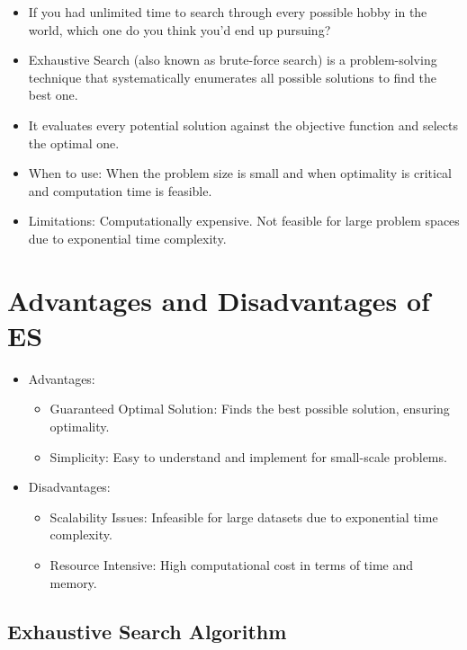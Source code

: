 \documentclass[
  letterpaper,
  DIV=11,
  numbers=noendperiod]{scrreprt}
\providecommand{\tightlist}{%
  \setlength{\itemsep}{0pt}\setlength{\parskip}{0pt}}\usepackage{longtable,booktabs,array}
\begin{document}
\begin{itemize}
\item
  If you had unlimited time to search through every possible hobby in
  the world, which one do you think you'd end up pursuing?
\item
  Exhaustive Search (also known as brute-force search) is a
  problem-solving technique that systematically enumerates all possible
  solutions to find the best one.
\item
  It evaluates every potential solution against the objective function
  and selects the optimal one.
\item
  When to use: When the problem size is small and when optimality is
  critical and computation time is feasible.
\item
  Limitations: Computationally expensive. Not feasible for large problem
  spaces due to exponential time complexity.
\end{itemize}

\section{Advantages and Disadvantages of
ES}\label{advantages-and-disadvantages-of-es}

\begin{itemize}
\tightlist
\item
  Advantages:

  \begin{itemize}
  \tightlist
  \item
    Guaranteed Optimal Solution: Finds the best possible solution,
    ensuring optimality.
  \item
    Simplicity: Easy to understand and implement for small-scale
    problems.
  \end{itemize}
\item
  Disadvantages:

  \begin{itemize}
  \tightlist
  \item
    Scalability Issues: Infeasible for large datasets due to exponential
    time complexity.
  \item
    Resource Intensive: High computational cost in terms of time and
    memory.
  \end{itemize}
\end{itemize}

\subsection{Exhaustive Search
Algorithm}\label{exhaustive-search-algorithm}
\end{document}
